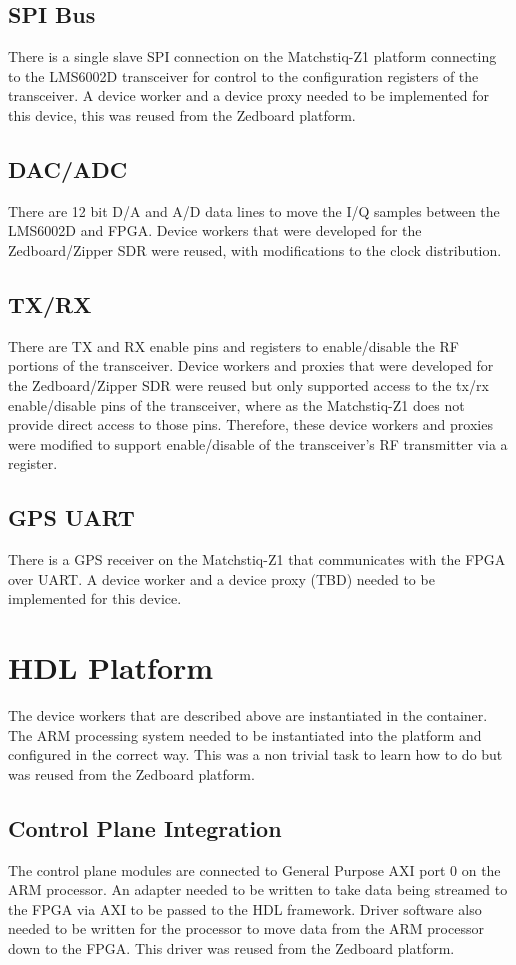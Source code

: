  \subsection{SPI Bus}
    There is a single slave SPI connection on the Matchstiq-Z1 platform connecting to the LMS6002D transceiver for control to the configuration registers of the transceiver.  A device worker and a device proxy needed to be implemented for this device, this was reused from the Zedboard platform.

  \subsection{DAC/ADC}
    There are 12 bit D/A and A/D data lines to move the I/Q samples between the LMS6002D and FPGA.  Device workers that were developed for the Zedboard/Zipper SDR were reused, with modifications to the clock distribution.

  \subsection{TX/RX}
    There are TX and RX enable pins and registers to enable/disable the RF portions of the transceiver.  Device workers and proxies that were developed for the Zedboard/Zipper SDR were reused but only supported access to the tx/rx enable/disable pins of the transceiver, where as the Matchstiq-Z1 does not provide direct access to those pins. Therefore, these device workers and proxies were modified to support enable/disable of the transceiver's RF transmitter via a register.

  \subsection{GPS UART}
    There is a GPS receiver on the Matchstiq-Z1 that communicates with the FPGA over UART.  A device worker and a device proxy (TBD) needed to be implemented for this device.

\section{HDL Platform}
  The device workers that are described above are instantiated in the container.  The ARM processing system needed to be instantiated into the platform and configured in the correct way. This was a non trivial task to learn how to do but was reused from the Zedboard platform.

  \subsection{Control Plane Integration}
    The control plane modules are connected to General Purpose AXI port 0 on the ARM processor.  An adapter needed to be written to take data being streamed to the FPGA via AXI to be passed to the HDL framework.  Driver software also needed to be written for the processor to move data from the ARM processor down to the FPGA.  This driver was reused from the Zedboard platform.



